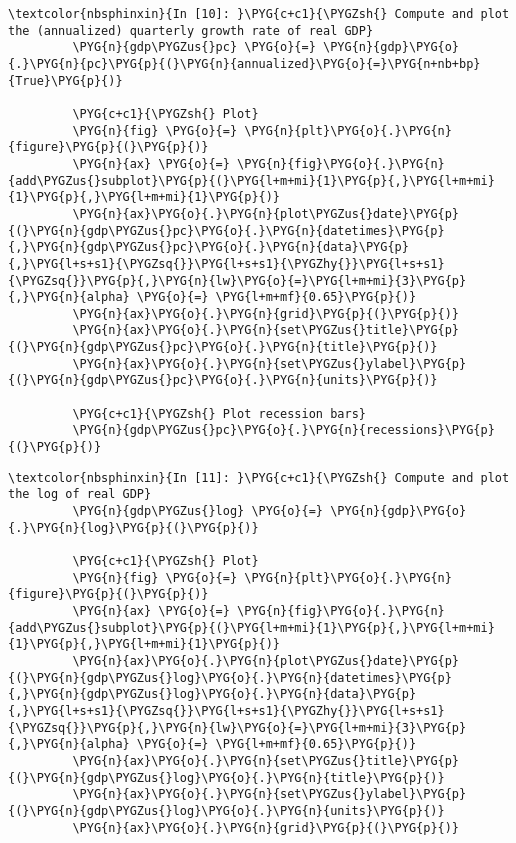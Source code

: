 \documentclass[letterpaper,10pt,openany,oneside,english]{sphinxmanual}
\begin{document}
\noindent{}

%
\begin{Verbatim}[commandchars=\\\{\}]
\textcolor{nbsphinxin}{In [10]: }\PYG{c+c1}{\PYGZsh{} Compute and plot the (annualized) quarterly growth rate of real GDP}
         \PYG{n}{gdp\PYGZus{}pc} \PYG{o}{=} \PYG{n}{gdp}\PYG{o}{.}\PYG{n}{pc}\PYG{p}{(}\PYG{n}{annualized}\PYG{o}{=}\PYG{n+nb+bp}{True}\PYG{p}{)}
         
         \PYG{c+c1}{\PYGZsh{} Plot}
         \PYG{n}{fig} \PYG{o}{=} \PYG{n}{plt}\PYG{o}{.}\PYG{n}{figure}\PYG{p}{(}\PYG{p}{)}
         \PYG{n}{ax} \PYG{o}{=} \PYG{n}{fig}\PYG{o}{.}\PYG{n}{add\PYGZus{}subplot}\PYG{p}{(}\PYG{l+m+mi}{1}\PYG{p}{,}\PYG{l+m+mi}{1}\PYG{p}{,}\PYG{l+m+mi}{1}\PYG{p}{)}
         \PYG{n}{ax}\PYG{o}{.}\PYG{n}{plot\PYGZus{}date}\PYG{p}{(}\PYG{n}{gdp\PYGZus{}pc}\PYG{o}{.}\PYG{n}{datetimes}\PYG{p}{,}\PYG{n}{gdp\PYGZus{}pc}\PYG{o}{.}\PYG{n}{data}\PYG{p}{,}\PYG{l+s+s1}{\PYGZsq{}}\PYG{l+s+s1}{\PYGZhy{}}\PYG{l+s+s1}{\PYGZsq{}}\PYG{p}{,}\PYG{n}{lw}\PYG{o}{=}\PYG{l+m+mi}{3}\PYG{p}{,}\PYG{n}{alpha} \PYG{o}{=} \PYG{l+m+mf}{0.65}\PYG{p}{)}
         \PYG{n}{ax}\PYG{o}{.}\PYG{n}{grid}\PYG{p}{(}\PYG{p}{)}
         \PYG{n}{ax}\PYG{o}{.}\PYG{n}{set\PYGZus{}title}\PYG{p}{(}\PYG{n}{gdp\PYGZus{}pc}\PYG{o}{.}\PYG{n}{title}\PYG{p}{)}
         \PYG{n}{ax}\PYG{o}{.}\PYG{n}{set\PYGZus{}ylabel}\PYG{p}{(}\PYG{n}{gdp\PYGZus{}pc}\PYG{o}{.}\PYG{n}{units}\PYG{p}{)}
         
         \PYG{c+c1}{\PYGZsh{} Plot recession bars}
         \PYG{n}{gdp\PYGZus{}pc}\PYG{o}{.}\PYG{n}{recessions}\PYG{p}{(}\PYG{p}{)}
\end{Verbatim}

\noindent{}

%
\begin{Verbatim}[commandchars=\\\{\}]
\textcolor{nbsphinxin}{In [11]: }\PYG{c+c1}{\PYGZsh{} Compute and plot the log of real GDP}
         \PYG{n}{gdp\PYGZus{}log} \PYG{o}{=} \PYG{n}{gdp}\PYG{o}{.}\PYG{n}{log}\PYG{p}{(}\PYG{p}{)}
         
         \PYG{c+c1}{\PYGZsh{} Plot}
         \PYG{n}{fig} \PYG{o}{=} \PYG{n}{plt}\PYG{o}{.}\PYG{n}{figure}\PYG{p}{(}\PYG{p}{)}
         \PYG{n}{ax} \PYG{o}{=} \PYG{n}{fig}\PYG{o}{.}\PYG{n}{add\PYGZus{}subplot}\PYG{p}{(}\PYG{l+m+mi}{1}\PYG{p}{,}\PYG{l+m+mi}{1}\PYG{p}{,}\PYG{l+m+mi}{1}\PYG{p}{)}
         \PYG{n}{ax}\PYG{o}{.}\PYG{n}{plot\PYGZus{}date}\PYG{p}{(}\PYG{n}{gdp\PYGZus{}log}\PYG{o}{.}\PYG{n}{datetimes}\PYG{p}{,}\PYG{n}{gdp\PYGZus{}log}\PYG{o}{.}\PYG{n}{data}\PYG{p}{,}\PYG{l+s+s1}{\PYGZsq{}}\PYG{l+s+s1}{\PYGZhy{}}\PYG{l+s+s1}{\PYGZsq{}}\PYG{p}{,}\PYG{n}{lw}\PYG{o}{=}\PYG{l+m+mi}{3}\PYG{p}{,}\PYG{n}{alpha} \PYG{o}{=} \PYG{l+m+mf}{0.65}\PYG{p}{)}
         \PYG{n}{ax}\PYG{o}{.}\PYG{n}{set\PYGZus{}title}\PYG{p}{(}\PYG{n}{gdp\PYGZus{}log}\PYG{o}{.}\PYG{n}{title}\PYG{p}{)}
         \PYG{n}{ax}\PYG{o}{.}\PYG{n}{set\PYGZus{}ylabel}\PYG{p}{(}\PYG{n}{gdp\PYGZus{}log}\PYG{o}{.}\PYG{n}{units}\PYG{p}{)}
         \PYG{n}{ax}\PYG{o}{.}\PYG{n}{grid}\PYG{p}{(}\PYG{p}{)}
\end{Verbatim}
\end{document}
